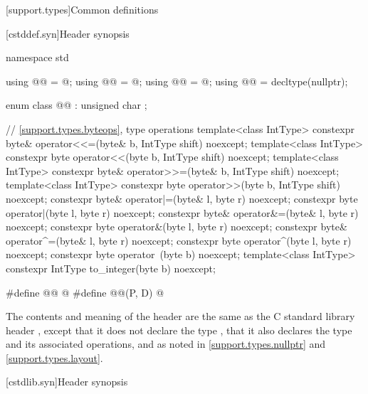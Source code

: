 [support.types]{Common definitions}

[cstddef.syn]{Header  synopsis}

\begin{codeblock}
namespace std {
  using @@ = @\seebelow@;
  using @@ = @\seebelow@;
  using @@ = @\seebelow@;
  using @@ = decltype(nullptr);

  enum class @@ : unsigned char {};

  // \ref{support.types.byteops},  type operations
  template<class IntType>
    constexpr byte& operator<<=(byte& b, IntType shift) noexcept;
  template<class IntType>
    constexpr byte operator<<(byte b, IntType shift) noexcept;
  template<class IntType>
    constexpr byte& operator>>=(byte& b, IntType shift) noexcept;
  template<class IntType>
    constexpr byte operator>>(byte b, IntType shift) noexcept;
  constexpr byte& operator|=(byte& l, byte r) noexcept;
  constexpr byte operator|(byte l, byte r) noexcept;
  constexpr byte& operator&=(byte& l, byte r) noexcept;
  constexpr byte operator&(byte l, byte r) noexcept;
  constexpr byte& operator^=(byte& l, byte r) noexcept;
  constexpr byte operator^(byte l, byte r) noexcept;
  constexpr byte operator~(byte b) noexcept;
  template<class IntType>
    constexpr IntType to_integer(byte b) noexcept;
}

#define @@ @\seebelow@
#define @@(P, D) @\seebelow@
\end{codeblock}

\pnum
The contents and meaning of the header  are the same as
the C standard library header ,
except that it does not declare the type ,
that it also declares the type 
and its associated operations,
and as noted in
\ref{support.types.nullptr} and
\ref{support.types.layout}.


[cstdlib.syn]{Header  synopsis}

